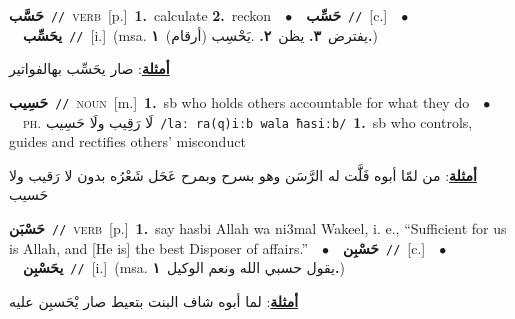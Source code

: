 \documentclass[10pt,a4paper,twoside]{article} %
\begin{document}
\begin{multicols}{2}
{\setlength\topsep{0pt}\textbf{\foreignlanguage{arabic}{حَسَّب}}\ {\color{gray}\texttt{//}\color{black}}\ \textsc{verb}\ [p.]\ \textbf{1.}~calculate  \textbf{2.}~reckon\ \ $\bullet$\ \ \setlength\topsep{0pt}\textbf{\foreignlanguage{arabic}{حَسِّب}}\ {\color{gray}\texttt{//}\color{black}}\ [c.]\ \ $\bullet$\ \ \setlength\topsep{0pt}\textbf{\foreignlanguage{arabic}{يحَسِّب}}\ {\color{gray}\texttt{//}\color{black}}\ [i.]\ \color{gray}(msa. \foreignlanguage{arabic}{يفترض}~\foreignlanguage{arabic}{\textbf{٣.}}  \foreignlanguage{arabic}{يظن}~\foreignlanguage{arabic}{\textbf{٢.}}  .\foreignlanguage{arabic}{يَحْسِب (أرقام)}~\foreignlanguage{arabic}{\textbf{١.}})\color{black}\  \begin{flushright}\color{gray}\foreignlanguage{arabic}{\textbf{\underline{\foreignlanguage{arabic}{أمثلة}}}: صار يحَسِّب بهالفواتير}\end{flushright}\color{black}} \vspace{2mm}

{\setlength\topsep{0pt}\textbf{\foreignlanguage{arabic}{حَسِيب}}\ {\color{gray}\texttt{//}\color{black}}\ \textsc{noun}\ [m.]\ \textbf{1.}~sb who holds others accountable for what they do\ \ $\bullet$\ \ \textsc{ph.} \color{gray} \foreignlanguage{arabic}{لَا رَقِيب ولَا حَسِيب}\color{black}\ {\color{gray}\texttt{/{\sffamily laː ra(q)iːb wala ħasiːb}/}\color{black}}\ \textbf{1.}~sb who controls, guides and rectifies others' misconduct\  \begin{flushright}\color{gray}\foreignlanguage{arabic}{\textbf{\underline{\foreignlanguage{arabic}{أمثلة}}}: من لمّا أبوه فَلََّت له الرَّسَن وهو بسرح وبمرح عَحَل شَعْرُه بدون لا رَقيب ولا حَسيب}\end{flushright}\color{black}} \vspace{2mm}

{\setlength\topsep{0pt}\textbf{\foreignlanguage{arabic}{حَسْبَن}}\ {\color{gray}\texttt{//}\color{black}}\ \textsc{verb}\ [p.]\ \textbf{1.}~say hasbi Allah wa ni3mal Wakeel, i. e., “Sufficient for us is Allah, and [He is] the best Disposer of affairs.”\ \ $\bullet$\ \ \setlength\topsep{0pt}\textbf{\foreignlanguage{arabic}{حَسْبِن}}\ {\color{gray}\texttt{//}\color{black}}\ [c.]\ \ $\bullet$\ \ \setlength\topsep{0pt}\textbf{\foreignlanguage{arabic}{يحَسْبِن}}\ {\color{gray}\texttt{//}\color{black}}\ [i.]\ \color{gray}(msa. \foreignlanguage{arabic}{يقول حسبي الله ونعم الوكيل}~\foreignlanguage{arabic}{\textbf{١.}})\color{black}\  \begin{flushright}\color{gray}\foreignlanguage{arabic}{\textbf{\underline{\foreignlanguage{arabic}{أمثلة}}}: لما أبوه شاف البنت بتعيط صار يْحَسبِن عليه}\end{flushright}\color{black}} \vspace{2mm}


\end{multicols}
\end{document}
